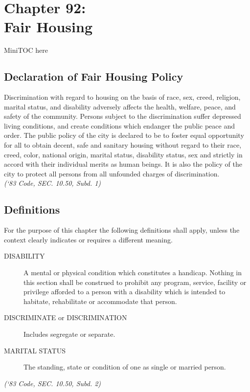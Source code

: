\documentclass[code.tex]{subfiles}
\begin{document}
\chapter*{Chapter 92: \\
	Fair Housing}

MiniTOC here
\pagebreak

\section{Declaration of Fair Housing Policy}
Discrimination with regard to housing on the basis of race, sex, creed, religion, marital status, and disability adversely affects the health, welfare, peace, and safety of the community.  Persons subject to the discrimination suffer depressed living conditions, and create conditions which endanger the public peace and order. The public policy of the city is declared to be to foster equal opportunity for all to obtain decent, safe and sanitary housing without regard to their race, creed, color, national origin, marital status, disability status, sex and strictly in accord with their individual merits as human beings. It is also the policy of the city to protect all persons from all unfounded charges of discrimination.\\
\emph{(‘83 Code, SEC. 10.50, Subd. 1)}
\section{Definitions}
For the purpose of this chapter the following definitions shall apply, unless the context clearly indicates or requires a different meaning.
\begin{description}
\item[DISABILITY] A mental or physical condition which constitutes a handicap.  Nothing in this section shall be construed to prohibit any program, service, facility or privilege afforded to a person with a disability which is intended to habitate, rehabilitate or accommodate that person.
\item[DISCRIMINATE or DISCRIMINATION] Includes segregate or separate.
\item[MARITAL STATUS] The standing, state or condition of one as single or married person.
\end{description}
\emph{(‘83 Code, SEC. 10.50, Subd. 2)}
\end{document}
